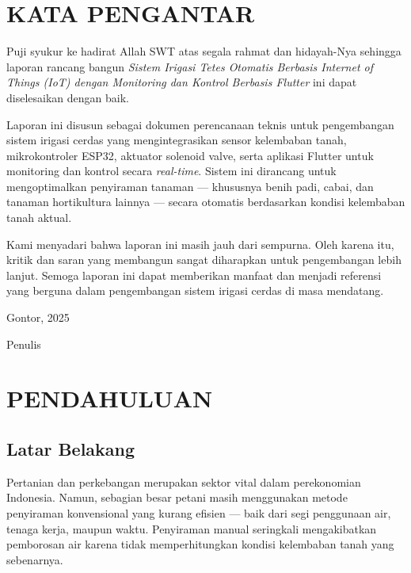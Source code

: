 \documentclass[12pt,a4paper,oneside]{report}
\begin{document}
\chapter*{KATA PENGANTAR}

Puji syukur ke hadirat Allah SWT atas segala rahmat dan hidayah-Nya sehingga laporan rancang bangun \textit{Sistem Irigasi Tetes Otomatis Berbasis Internet of Things (IoT) dengan Monitoring dan Kontrol Berbasis Flutter} ini dapat diselesaikan dengan baik.

Laporan ini disusun sebagai dokumen perencanaan teknis untuk pengembangan sistem irigasi cerdas yang mengintegrasikan sensor kelembaban tanah, mikrokontroler ESP32, aktuator solenoid valve, serta aplikasi Flutter untuk monitoring dan kontrol secara \textit{real-time}. Sistem ini dirancang untuk mengoptimalkan penyiraman tanaman — khususnya benih padi, cabai, dan tanaman hortikultura lainnya — secara otomatis berdasarkan kondisi kelembaban tanah aktual.

Kami menyadari bahwa laporan ini masih jauh dari sempurna. Oleh karena itu, kritik dan saran yang membangun sangat diharapkan untuk pengembangan lebih lanjut. Semoga laporan ini dapat memberikan manfaat dan menjadi referensi yang berguna dalam pengembangan sistem irigasi cerdas di masa mendatang.

\vspace{1cm}
\begin{flushright}
Gontor, 2025

Penulis
\end{flushright}

\newpage
\tableofcontents
\newpage

\listoffigures
\listoftables

\chapter{PENDAHULUAN}

\section{Latar Belakang}

Pertanian dan perkebangan merupakan sektor vital dalam perekonomian Indonesia. Namun, sebagian besar petani masih menggunakan metode penyiraman konvensional yang kurang efisien — baik dari segi penggunaan air, tenaga kerja, maupun waktu. Penyiraman manual seringkali mengakibatkan pemborosan air karena tidak memperhitungkan kondisi kelembaban tanah yang sebenarnya.
\end{document}
